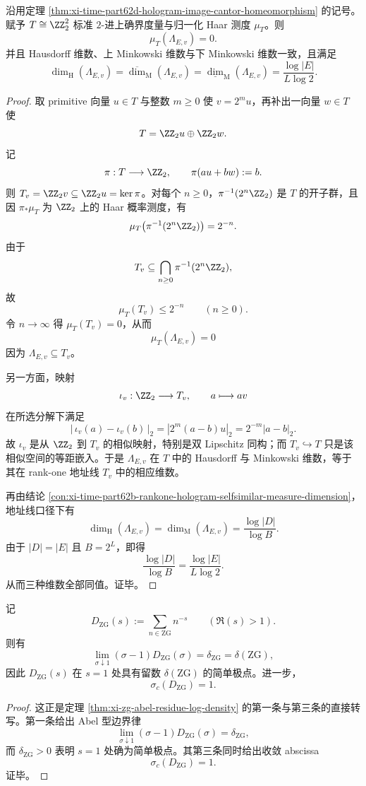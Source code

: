 \begin{theorem}\label{thm:xi-time-part62d-hologram-image-zero-haar-dimension}
沿用定理 \ref{thm:xi-time-part62d-hologram-image-cantor-homeomorphism} 的记号。赋予
\(
T\cong \ZZ_2^2
\)
标准 \(2\)-进上确界度量与归一化 Haar 测度 \(\mu_T\)。则
\[
\mu_T(\Lambda_{E,v})=0.
\]
并且 Hausdorff 维数、上 Minkowski 维数与下 Minkowski 维数一致，且满足
\[
\dim_{\mathrm H}(\Lambda_{E,v})
=
\overline{\dim}_{\mathrm M}(\Lambda_{E,v})
=
\underline{\dim}_{\mathrm M}(\Lambda_{E,v})
=
\frac{\log |E|}{L\log 2}.
\]
\end{theorem}
\begin{proof}
取 primitive 向量 \(u\in T\) 与整数 \(m\ge 0\) 使 \(v=2^m u\)，再补出一向量 \(w\in T\) 使
\[
T=\ZZ_2u\oplus \ZZ_2w.
\]
记
\[
\pi:T\longrightarrow \ZZ_2,
\qquad
\pi(au+bw):=b.
\]
则 \(T_v=\ZZ_2v\subseteq \ZZ_2u=\ker \pi\)。对每个 \(n\ge 0\)，\(\pi^{-1}(2^n\ZZ_2)\) 是 \(T\) 的开子群，且因 \(\pi_*\mu_T\) 为 \(\ZZ_2\) 上的 Haar 概率测度，有
\[
\mu_T\bigl(\pi^{-1}(2^n\ZZ_2)\bigr)=2^{-n}.
\]
由于
\[
T_v\subseteq \bigcap_{n\ge 0}\pi^{-1}(2^n\ZZ_2),
\]
故
\[
\mu_T(T_v)\le 2^{-n}\qquad (n\ge 0).
\]
令 \(n\to\infty\) 得 \(\mu_T(T_v)=0\)，从而
\[
\mu_T(\Lambda_{E,v})=0
\]
因为 \(\Lambda_{E,v}\subseteq T_v\)。

另一方面，映射
\[
\iota_v:\ZZ_2\longrightarrow T_v,
\qquad
a\longmapsto av
\]
在所选分解下满足
\[
|\,\iota_v(a)-\iota_v(b)\,|_2
=
|2^m(a-b)u|_2
=
2^{-m}|a-b|_2.
\]
故 \(\iota_v\) 是从 \(\ZZ_2\) 到 \(T_v\) 的相似映射，特别是双 Lipschitz 同构；而 \(T_v\hookrightarrow T\) 只是该相似空间的等距嵌入。于是 \(\Lambda_{E,v}\) 在 \(T\) 中的 Hausdorff 与 Minkowski 维数，等于其在 rank-one 地址线 \(T_v\) 中的相应维数。

再由结论 \ref{con:xi-time-part62b-rankone-hologram-selfsimilar-measure-dimension}，地址线口径下有
\[
\dim_{\mathrm H}(\Lambda_{E,v})
=
\dim_{\mathrm M}(\Lambda_{E,v})
=
\frac{\log |D|}{\log B}.
\]
由于 \(|D|=|E|\) 且 \(B=2^L\)，即得
\[
\frac{\log |D|}{\log B}=\frac{\log |E|}{L\log 2}.
\]
从而三种维数全部同值。证毕。
\end{proof}

\begin{theorem}\label{thm:xi-time-part62d-zg-dirichlet-tauberian-pole-abscissa}
记
\[
D_{\mathrm{ZG}}(s):=\sum_{n\in \mathrm{ZG}}n^{-s}
\qquad (\Re(s)>1).
\]
则有
\[
\lim_{\sigma\downarrow 1}(\sigma-1)D_{\mathrm{ZG}}(\sigma)=\delta_{\mathrm{ZG}}=\delta(\mathrm{ZG}),
\]
因此 \(D_{\mathrm{ZG}}(s)\) 在 \(s=1\) 处具有留数 \(\delta(\mathrm{ZG})\) 的简单极点。进一步，
\[
\sigma_c(D_{\mathrm{ZG}})=1.
\]
\end{theorem}
\begin{proof}
这正是定理 \ref{thm:xi-zg-abel-residue-log-density} 的第一条与第三条的直接转写。第一条给出 Abel 型边界律
\[
\lim_{\sigma\downarrow 1}(\sigma-1)D_{\mathrm{ZG}}(\sigma)=\delta_{\mathrm{ZG}},
\]
而 \(\delta_{\mathrm{ZG}}>0\) 表明 \(s=1\) 处确为简单极点。其第三条同时给出收敛 abscissa
\[
\sigma_c(D_{\mathrm{ZG}})=1.
\]
证毕。
\end{proof}

